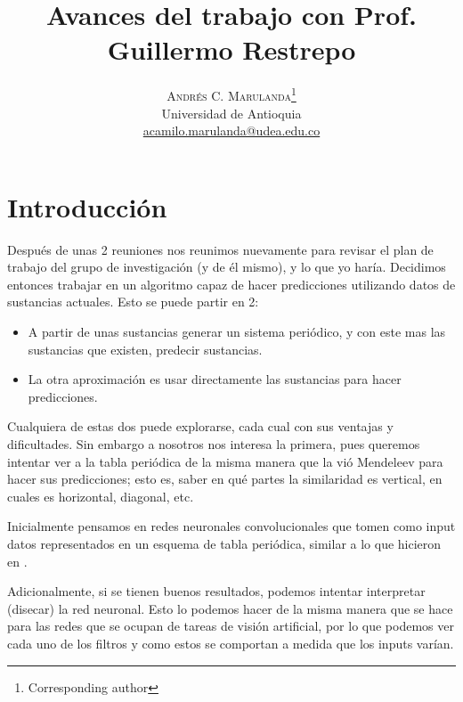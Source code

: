 \documentclass[twoside,twocolumn]{article}
\begin{document}
\title{Avances del trabajo con Prof. Guillermo Restrepo} 

\author{%
\textsc{Andr\'es C. Marulanda}\thanks{Corresponding author} \\[1ex]
\normalsize Universidad de Antioquia \\ %
\normalsize \href{mailto:correoAndres}{acamilo.marulanda@udea.edu.co} %
}


\maketitle


\section{Introducci\'on}
\label{sec:intro}

Despu\'es de unas 2 reuniones nos reunimos nuevamente para revisar el plan de trabajo del grupo de investigaci\'on (y de \'el mismo), y lo que yo har\'ia. Decidimos entonces trabajar en un algoritmo capaz de hacer predicciones utilizando datos de sustancias actuales.
Esto se puede partir en 2: 

\begin{itemize}
\item A partir de unas sustancias generar un sistema peri\'odico, y con este mas las sustancias que existen, predecir sustancias. 
\item La otra aproximaci\'on es usar directamente las sustancias para hacer predicciones.
\end{itemize}

Cualquiera de estas dos puede explorarse, cada cual con sus ventajas y dificultades. Sin embargo a nosotros nos interesa la primera, pues queremos intentar ver a la tabla peri\'odica de la misma manera que la vi\'o Mendeleev para hacer sus predicciones; esto es, saber en qu\'e partes la similaridad es vertical, en cuales es horizontal, diagonal, etc.

Inicialmente pensamos en redes neuronales convolucionales que tomen como input datos representados en un esquema de tabla peri\'odica, similar a lo que hicieron en \cite{CNN_dH}.

Adicionalmente, si se tienen buenos resultados, podemos intentar interpretar (disecar) la red neuronal. Esto lo podemos hacer de la misma manera que se hace para las redes que se ocupan de tareas de visi\'on artificial, por lo que podemos ver cada uno de los filtros y como estos se comportan a medida que los inputs var\'ian. 
\end{document}
